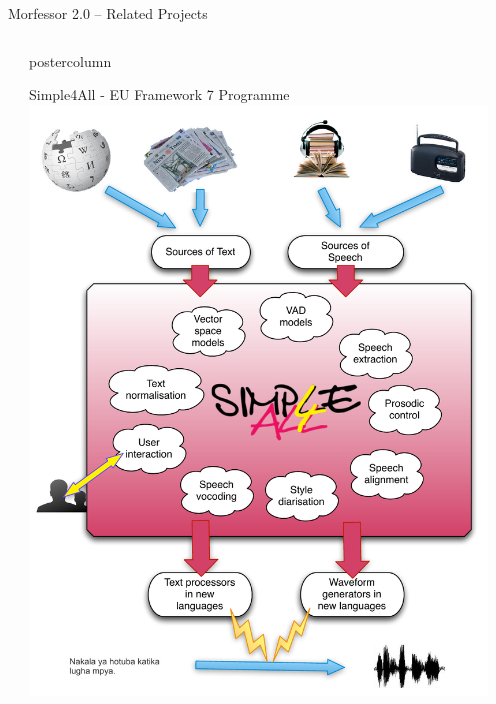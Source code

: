 \documentclass[final]{beamer} %
\begin{document}
\begin{frame}{Morfessor 2.0 -- Related Projects}
\begin{columns}
\begin{column}{.49\textwidth}
\end{column}
\begin{column}{.45\textwidth}
  \begin{beamercolorbox}[center,wd=\textwidth]{postercolumn}
 \begin{block}{Simple4All - EU Framework 7 Programme}
\includegraphics[width=0.95\textwidth]{s4a}             
            \end{block}
            
	\end{beamercolorbox}
\end{column}

\end{columns}
 \end{frame}



  
\end{document}
